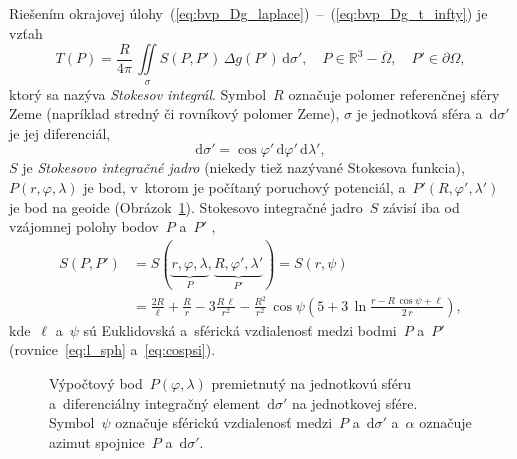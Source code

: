 \documentclass[a4paper,12pt]{book}
\newcommand{\diff}{\mathrm d}
\begin{document}
Riešením okrajovej úlohy~(\ref{eq:bvp_Dg_laplace})~--~(\ref{eq:bvp_Dg_t_infty}) 
je vzťah
%
\begin{equation}
\label{eq:stokes}
T(P) = \frac{R}{4\pi} \, \iint\limits_{\sigma} S(P, P') \, \Delta g(P') \, 
\diff \sigma'{,} \quad P \in \mathbb{R}^3 - \overline\Omega{,} \quad P' \in 
\partial\Omega{,}
\end{equation}
%
ktorý sa nazýva \emph{Stokesov integrál}.  Symbol~$R$ označuje polomer 
referenčnej sféry Zeme (napríklad stredný či rovníkový polomer Zeme), $\sigma$ 
je jednotková sféra a~$\diff\sigma'$ je jej diferenciál,
%
\begin{equation}
\label{eq:diff_sigma}
\diff\sigma' = \cos\varphi' \, \diff\varphi' \, \diff\lambda'{,}
\end{equation}
%
$S$ je \emph{Stokesovo integračné jadro} (niekedy tiež nazývané Stokesova 
funkcia), $P(r, \varphi, \lambda)$ je bod, v~ktorom je počítaný poruchový 
potenciál, a~$P'(R, \varphi', \lambda')$ je bod na geoide 
(Obrázok~\ref{fig:surface_integral}).  Stokesovo integračné jadro~$S$ závisí 
iba od vzájomnej polohy bodov~$P$ a~$P'$ \parencite{MoritzPhysicalGeodesy},
%
\begin{equation}
\label{eq:stokes_kernel_general}
\begin{split}
S(P, P') &= S(\underbrace{r, \varphi, \lambda}_{P}, \underbrace{R, \varphi', 
\lambda'}_{P'}) = S(r, \psi)\\
%
&= \frac{2R}{\ell} + \frac{R}{r} - 3\frac{R \, \ell}{r^2} - \frac{R^2}{r^2} \, 
\cos\psi\left( 5 + 3 \, \ln \frac{r - R \, \cos\psi + \ell}{2 \, r} \right){,}
\end{split}
\end{equation}
%
kde~$\ell$ a~$\psi$ sú Euklidovská a~sférická vzdialenosť medzi bodmi~$P$ 
a~$P'$ (rovnice~\ref{eq:l_sph} a~\ref{eq:cospsi}).

\begin{figure}[bt]
\centering

\caption{Výpočtový bod~$P(\varphi, \lambda)$ premietnutý na jednotkovú sféru 
a~diferenciálny integračný element~$\diff\sigma'$ na jednotkovej sfére.  
Symbol~$\psi$ označuje sférickú vzdialenosť medzi~$P$ a~$\diff\sigma'$ 
a~$\alpha$ označuje azimut spojnice~$P$ a~$\diff\sigma'$.}
\label{fig:surface_integral}
\end{figure}
\end{document}
